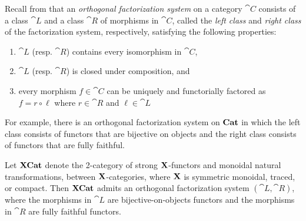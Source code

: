 \documentclass[12pt,oneside,article,draft]{memoir}
\begin{document}
Recall from \cite{} that an \emph{orthogonal factorization system} on a category $\cat{C}$ consists of a class $\cat{L}$ and a class $\cat{R}$ of morphisms in $\cat{C}$, called the \emph{left class} and \emph{right class} of the factorization system, respectively, satisfying the following properties:
\begin{enumerate}
\item $\cat{L}$ (resp. $\cat{R}$) contains every isomorphism in $\cat{C}$, 
\item $\cat{L}$ (resp. $\cat{R}$) is closed under composition, and
\item every morphism $f\in\cat{C}$ can be uniquely and functorially factored as $f=r\circ\ell$ where $r\in\cat{R}$ and $\ell\in\cat{L}$
\end{enumerate}
For example, there is an orthogonal factorization system on $\mathbf{Cat}$ in which the left class consists of functors that are bijective on objects and the right class consists of functors that are fully faithful. 



\begin{lemma}\label{lemma:factorization system}

Let $\mathbf{XCat}$ denote the 2-category of strong $\mathbf{X}$-functors and monoidal natural transformations, between $\mathbf{X}$-categories, where $\mathbf{X}$ is symmetric monoidal, traced, or compact. Then $\mathbf{XCat}$ admits an orthogonal factorization system $(\cat{L},\cat{R})$, where the morphisms in $\cat{L}$ are bijective-on-objects functors and the morphisms in $\cat{R}$ are fully faithful functors.

\end{lemma}
\end{document}
